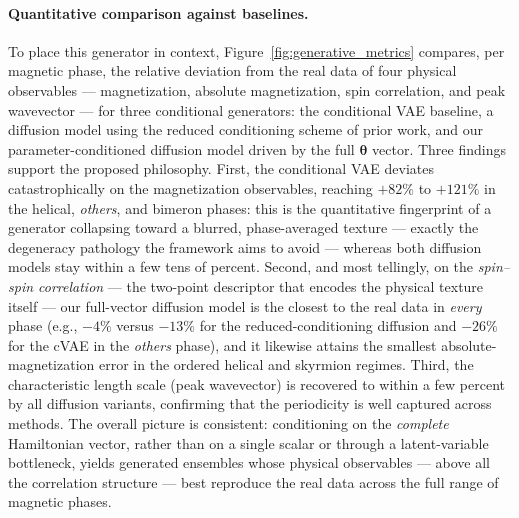 \documentclass[letterpaper, 12, one column]{article}
\begin{document}
\paragraph{Quantitative comparison against baselines.}
{\color[rgb]{0,0,1}To place this generator in context, Figure~\ref{fig:generative_metrics} compares, per magnetic phase, the relative deviation from the real data of four physical observables --- magnetization, absolute magnetization, spin correlation, and peak wavevector --- for three conditional generators: the conditional VAE baseline, a diffusion model using the reduced conditioning scheme of prior work, and our parameter-conditioned diffusion model driven by the full $\boldsymbol{\theta}$ vector. Three findings support the proposed philosophy. First, the conditional VAE deviates catastrophically on the magnetization observables, reaching $+82\%$ to $+121\%$ in the helical, \textit{others}, and bimeron phases: this is the quantitative fingerprint of a generator collapsing toward a blurred, phase-averaged texture --- exactly the degeneracy pathology the framework aims to avoid --- whereas both diffusion models stay within a few tens of percent. Second, and most tellingly, on the \emph{spin--spin correlation} --- the two-point descriptor that encodes the physical texture itself --- our full-vector diffusion model is the closest to the real data in \emph{every} phase (e.g., $-4\%$ versus $-13\%$ for the reduced-conditioning diffusion and $-26\%$ for the cVAE in the \textit{others} phase), and it likewise attains the smallest absolute-magnetization error in the ordered helical and skyrmion regimes. Third, the characteristic length scale (peak wavevector) is recovered to within a few percent by all diffusion variants, confirming that the periodicity is well captured across methods. The overall picture is consistent: conditioning on the \emph{complete} Hamiltonian vector, rather than on a single scalar or through a latent-variable bottleneck, yields generated ensembles whose physical observables --- above all the correlation structure --- best reproduce the real data across the full range of magnetic phases.}
\end{document}
